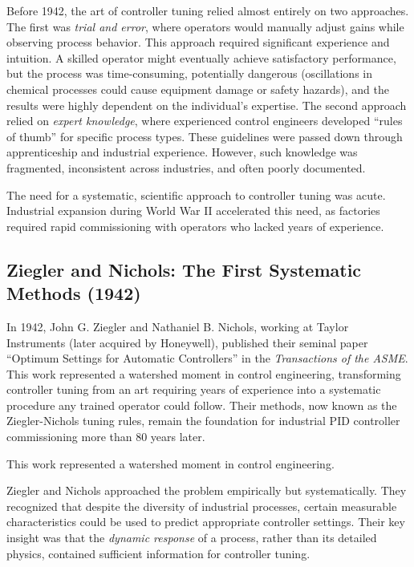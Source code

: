 Before 1942, the art of controller tuning relied almost entirely on two approaches. The first was \textit{trial and error}, where operators would manually adjust gains while observing process behavior. This approach required significant experience and intuition. A skilled operator might eventually achieve satisfactory performance, but the process was time-consuming, potentially dangerous (oscillations in chemical processes could cause equipment damage or safety hazards), and the results were highly dependent on the individual's expertise. The second approach relied on \textit{expert knowledge}, where experienced control engineers developed ``rules of thumb'' for specific process types. These guidelines were passed down through apprenticeship and industrial experience. However, such knowledge was fragmented, inconsistent across industries, and often poorly documented.

The need for a systematic, scientific approach to controller tuning was acute. Industrial expansion during World War II accelerated this need, as factories required rapid commissioning with operators who lacked years of experience.

\subsection{Ziegler and Nichols: The First Systematic Methods (1942)}

\begin{historicalbox}
In 1942, John G. Ziegler and Nathaniel B. Nichols, working at Taylor Instruments (later acquired by Honeywell), published their seminal paper ``Optimum Settings for Automatic Controllers'' in the \textit{Transactions of the ASME}. This work represented a watershed moment in control engineering, transforming controller tuning from an art requiring years of experience into a systematic procedure any trained operator could follow. Their methods, now known as the Ziegler-Nichols tuning rules, remain the foundation for industrial PID controller commissioning more than 80 years later.
\end{historicalbox}

This work represented a watershed moment in control engineering.

Ziegler and Nichols approached the problem empirically but systematically. They recognized that despite the diversity of industrial processes, certain measurable characteristics could be used to predict appropriate controller settings. Their key insight was that the \textit{dynamic response} of a process, rather than its detailed physics, contained sufficient information for controller tuning.


